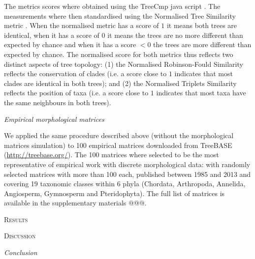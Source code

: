\documentclass[12pt,letterpaper]{article}
\renewcommand{\section}[1]{%
\bigskip
\begin{center}
\begin{Large}
\normalfont\scshape #1
\medskip
\end{Large}
\end{center}}
\renewcommand{\subsection}[1]{%
\bigskip
\begin{center}
\begin{large}
\normalfont\itshape #1
\end{large}
\end{center}}
\begin{document}
The metrics scores where obtained using the TreeCmp java script \citep{Bogdanowicz2012}.
The measurements where then standardised using the Normalised Tree Similarity metric \citep[i.e. centering the metrics scores using the mean metric score for 1000 pairwise comparisons between random trees with $n$ taxa;][]{Bogdanowicz2012,Guillerme2016146}.
When the normalised metric has a score of $1$ it means both trees are identical, when it has a score of $0$ it means the trees are no more different than expected by chance and when it has a score $<0$ the trees are more different than expected by chance.
The normalised score for both metrics thus reflects two distinct aspects of tree topology: (1) the Normalised Robinson-Fould Similarity reflects the conservation of clades (i.e. a score close to $1$ indicates that most clades are identical in both trees); and (2) the Normalised Triplets Similarity reflects the position of taxa (i.e. a score close to $1$ indicates that most taxa have the same neighbours in both trees).

\subsection{Empirical morphological matrices}

We applied the same procedure described above (without the morphological matrices simulation) to 100 empirical matrices downloaded from TreeBASE (\url{http://treebase.org/}).
The 100 matrices where selected to be the most representative of empirical work with discrete morphological data: with randomly selected matrices with more than 100 each, published between 1985 and 2013 and covering 19 taxonomic classes within 6 phyla (Chordata, Arthropoda, Annelida, Angiosperm, Gymnosperm and Pteridophyta).
The full list of matrices is available in the supplementary materials @@@.

\section{Results}


\section{Discussion}


\subsection{Conclusion}
\end{document}
